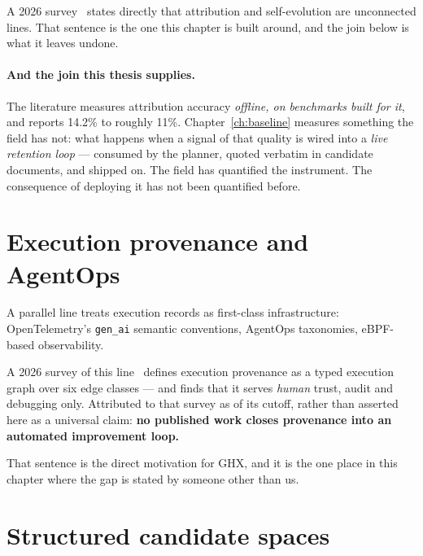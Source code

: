 A 2026 survey~\cite{survey-attr-evolve} states directly that attribution
and self-evolution are unconnected lines. That sentence is the one this
chapter is built around, and the join below is what it leaves undone.

\paragraph{And the join this thesis supplies.} The literature measures
attribution accuracy \emph{offline, on benchmarks built for it}, and
reports 14.2\% to roughly 11\%. Chapter~\ref{ch:baseline} measures
something the field has not: what happens when a signal of that quality is
wired into a \emph{live retention loop} --- consumed by the planner, quoted
verbatim in candidate documents, and shipped on. The field has quantified
the instrument. The consequence of deploying it has not been quantified
before.

\section{Execution provenance and AgentOps}
\label{sec:provenance}

A parallel line treats execution records as first-class infrastructure:
OpenTelemetry's \texttt{gen\_ai} semantic conventions, AgentOps
taxonomies, eBPF-based observability.

A 2026 survey of this line~\cite{survey-provenance} defines execution
provenance as a typed execution graph over six edge classes --- and finds
that it serves \emph{human} trust, audit and debugging only. Attributed to
that survey as of its cutoff, rather than asserted here as a universal
claim: \textbf{no published work closes provenance into an automated
improvement loop.}

That sentence is the direct motivation for GHX, and it is the one place in
this chapter where the gap is stated by someone other than us.

\section{Structured candidate spaces}
\label{sec:structured-spaces}

